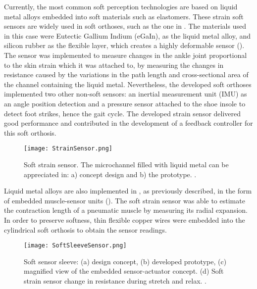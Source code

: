 Currently, the most common soft perception technologies are based on liquid metal alloys embedded into soft materials such as elastomers. These strain soft sensors are widely used in soft orthoses, such as the one in \cite{park2011bio}. The materials used in this case were Eutectic Gallium Indium (eGaIn), as the liquid metal alloy, and silicon rubber as the flexible layer, which creates a highly deformable sensor (). The sensor was implemented to measure changes in the ankle joint proportional to the skin strain which it was attached to, by measuring the changes in resistance caused by the variations in the path length and cross-sectional area of the channel containing the liquid metal. Nevertheless, the developed soft orthoses implemented two other non-soft sensors: an inertial measurement unit (IMU) as an angle position detection and a pressure sensor attached to the shoe insole to detect foot strikes, hence the gait cycle. The developed strain sensor delivered good performance and contributed in the development of a feedback controller for this soft orthosis.

\begin{figure}[hbtp!]
    \centering
    \texttt{[image: StrainSensor.png]}
    \caption{Soft strain sensor. The microchannel filled with liquid metal can be appreciated in: a) concept design and b) the prototype. \cite{park2011bio}. }
    \label{fig:strain_sensor}
\end{figure}

Liquid metal alloys are also implemented in \cite{Park2012}, as previously described, in the form of embedded muscle-sensor units (). The soft strain sensor was able to estimate the contraction length of a pneumatic muscle by measuring its radial expansion. In order to preserve softness, thin flexible copper wires were embedded into the cylindrical soft orthosis to obtain the sensor readings.

\begin{figure}[hbtp!]
    \centering
    \texttt{[image: SoftSleeveSensor.png]}
    \caption{Soft sensor sleeve: (a) design concept, (b) developed prototype, (c) magnified view of the embedded sensor-actuator concept. (d) Soft strain sensor change in resistance during stretch and relax. \cite{Park2012}. }
    \label{fig:soft_sleeve_sensor}
\end{figure}


